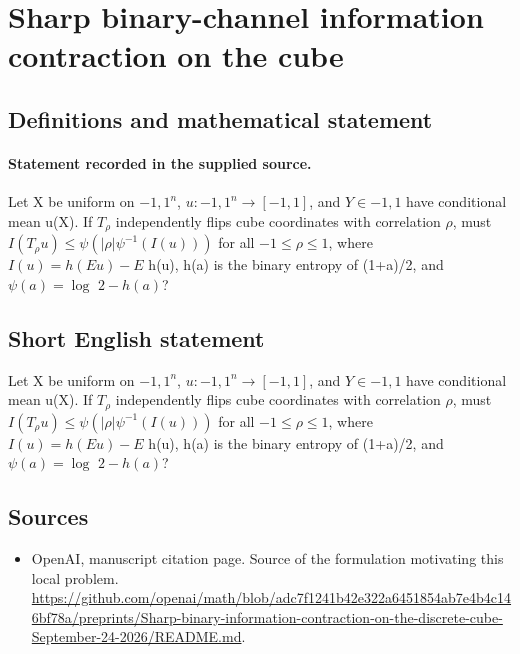 \documentclass[11pt]{article}
\begin{document}
\section*{Sharp binary-channel information contraction on the cube}\label{30007451}
\subsection{Definitions and mathematical statement}
\paragraph{Statement recorded in the supplied source.}
Let X be uniform on ${-1,1}^n$, $u:{-1,1}^n\to [-1,1]$, and $Y\in {-1,1}$ have conditional mean u(X). If $T_\rho $ independently flips cube coordinates with correlation $\rho $, must $I(T_\rho u)\leq \psi (|\rho |\psi ^{-1}(I(u)))$ for all $-1\leq \rho \leq 1$, where $I(u)=h(Eu)-E$ h(u), h(a) is the binary entropy of (1+a)/2, and $\psi (a)=\log $ $2-h(a)$?
\subsection{Short English statement}
Let X be uniform on ${-1,1}^n$, $u:{-1,1}^n\to [-1,1]$, and $Y\in {-1,1}$ have conditional mean u(X). If $T_\rho $ independently flips cube coordinates with correlation $\rho $, must $I(T_\rho u)\leq \psi (|\rho |\psi ^{-1}(I(u)))$ for all $-1\leq \rho \leq 1$, where $I(u)=h(Eu)-E$ h(u), h(a) is the binary entropy of (1+a)/2, and $\psi (a)=\log $ $2-h(a)$?
\subsection{Sources}
\begin{itemize}
\item[S1] OpenAI, manuscript citation page. Source of the formulation motivating this local problem.
\url{https://github.com/openai/math/blob/adc7f1241b42e322a6451854ab7e4b4c146bf78a/preprints/Sharp-binary-information-contraction-on-the-discrete-cube-September-24-2026/README.md}.
\end{itemize}
\end{document}
